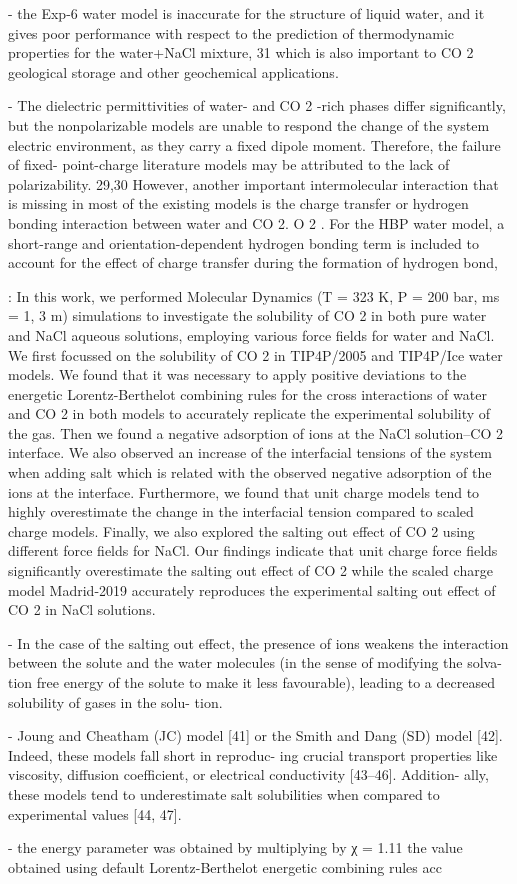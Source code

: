- the Exp-6 water model is inaccurate for the structure of liquid
water, and it gives poor performance with respect to the
prediction of thermodynamic properties for the water+NaCl
mixture, 31 which is also important to CO 2 geological storage
and other geochemical applications.

- The dielectric permittivities of water- and CO 2 -rich phases
diﬀer signiﬁcantly, but the nonpolarizable models are unable to
respond the change of the system electric environment, as they
carry a ﬁxed dipole moment. Therefore, the failure of ﬁxed-
point-charge literature models may be attributed to the lack of
polarizability. 29,30 However, another important intermolecular
interaction that is missing in most of the existing models is the
charge transfer or hydrogen bonding interaction between water
and CO 2. O 2 . For the HBP water model, a short-range and orientation-dependent hydrogen bonding term is included to account for the eﬀect of charge transfer during the formation of hydrogen bond,



\cite{Blasquez2023}: In this work, we performed Molecular Dynamics (T = 323 K, P = 200 bar, ms = 1, 3 m) simulations to investigate the solubility of CO 2 in both pure water and NaCl aqueous solutions, employing various force fields for water and NaCl. We first focussed on the solubility of CO 2 in TIP4P/2005 and TIP4P/Ice water models. We found that it was necessary to apply positive deviations to the energetic Lorentz-Berthelot combining rules for the cross interactions of water and CO 2 in both models to accurately replicate the experimental solubility of the gas. Then we found a negative adsorption of ions at the NaCl solution–CO 2 interface. We also observed an increase of the interfacial tensions of the system when adding salt which is related with the observed negative adsorption of the ions at the interface. Furthermore, we found that unit charge models tend to highly overestimate the change in the interfacial tension compared to scaled charge models. Finally, we also explored the salting out effect of CO 2 using different force fields for NaCl. Our findings indicate that unit charge force fields significantly overestimate the salting out effect of CO 2 while the scaled charge model Madrid-2019 accurately reproduces the experimental salting out effect of CO 2 in NaCl solutions.

- In the case of the salting out effect, the presence of
ions weakens the interaction between the solute and the
water molecules (in the sense of modifying the solva-
tion free energy of the solute to make it less favourable),
leading to a decreased solubility of gases in the solu-
tion.

- Joung and Cheatham (JC) model [41] or the Smith and Dang (SD)
model [42]. Indeed, these models fall short in reproduc-
ing crucial transport properties like viscosity, diffusion
coefficient, or electrical conductivity [43–46]. Addition-
ally, these models tend to underestimate salt solubilities
when compared to experimental values [44, 47].

- the energy parameter was obtained by multiplying by χ =
1.11 the value obtained using default Lorentz-Berthelot
energetic combining rules acc